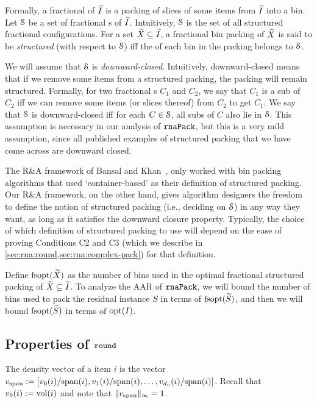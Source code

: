 Formally, a fractional \config{} of $\widetilde{I}$ is a packing of slices of
some items from $\widetilde{I}$ into a bin.
Let $\mathcal{S}$ be a set of fractional \config{}s of $\widetilde{I}$.
Intuitively, $\mathcal{S}$ is the set of all structured fractional configurations.
For a set $\widetilde{X} \subseteq \widetilde{I}$, a fractional bin packing of $\widetilde{X}$
is said to be \emph{structured} (with respect to $\mathcal{S}$) iff
the \config{} of each bin in the packing belongs to $\mathcal{S}$.

We will assume that $\mathcal{S}$ is \emph{downward-closed}.
Intuitively, downward-closed means that if we remove some items from a structured packing,
the packing will remain structured. Formally,
for two fractional \config{}s $C_1$ and $C_2$, we say that $C_1$ is a sub\config{} of $C_2$
iff we can remove some items (or slices thereof) from $C_2$ to get $C_1$.
We say that $\mathcal{S}$ is downward-closed iff
for each $C \in \mathcal{S}$, all sub\config{}s of $C$ also lie in $\mathcal{S}$.
This assumption is necessary in our analysis of $\operatorname{\mathtt{rnaPack}}$,
but this is a very mild assumption, since all published examples of structured packing
that we have come across are downward closed.

The R\&A framework of Bansal and Khan~\cite{bansal2014binpacking},
only worked with bin packing algorithms that used `container-based'
as their definition of structured packing.
Our R\&A framework, on the other hand, gives algorithm designers the freedom to define
the notion of structured packing (i.e., deciding on $\mathcal{S}$) in any way they want,
as long as it satisfies the downward closure property.
Typically, the choice of which definition of structured packing to use will depend
on the ease of proving Conditions C2 and C3
(which we describe in \cref{sec:rna:round,sec:rna:complex-pack}) for that definition.

Define $\operatorname{fsopt}(\widetilde{X})$ as the number of bins used in the optimal
fractional structured packing of $\widetilde{X} \subseteq \widetilde{I}$.
To analyze the AAR of $\operatorname{\mathtt{rnaPack}}$, we will bound the number of bins used to pack
the residual instance $S$ in terms of $\operatorname{fsopt}(\widetilde{S})$,
and then we will bound $\operatorname{fsopt}(\widetilde{S})$ in terms of $\operatorname{opt}(I)$.

\subsection{Properties of \texorpdfstring{$\operatorname{\mathtt{round}}$}{round}}
\label{sec:rna:round}

\begin{definition}
The density vector of a  item $i$ is the vector
$v_{\operatorname{span}} := \left[v_0(i)/{\operatorname{span}(i)}, {v_1(i)}/{\operatorname{span}(i)}, \ldots, {v_{d_v}(i)}/{\operatorname{span}(i)}\right]$.
Recall that $v_0(i) := \operatorname{vol}(i)$
and note that $\|v_{\operatorname{span}}\|_{\infty} = 1$.
\end{definition}

